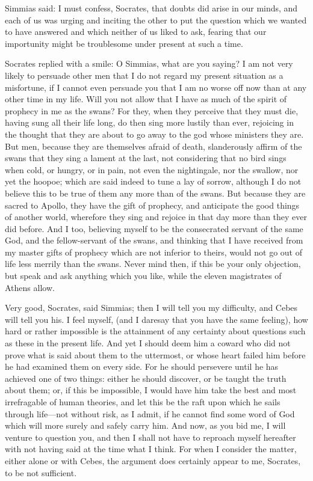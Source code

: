 \documentclass[11pt,letter]{article}
\begin{document}
\par  Simmias said: I must confess, Socrates, that doubts did arise in our minds, and each of us was urging and inciting the other to put the question which we wanted to have answered and which neither of us liked to ask, fearing that our importunity might be troublesome under present at such a time.

\par  Socrates replied with a smile: O Simmias, what are you saying? I am not very likely to persuade other men that I do not regard my present situation as a misfortune, if I cannot even persuade you that I am no worse off now than at any other time in my life. Will you not allow that I have as much of the spirit of prophecy in me as the swans? For they, when they perceive that they must die, having sung all their life long, do then sing more lustily than ever, rejoicing in the thought that they are about to go away to the god whose ministers they are. But men, because they are themselves afraid of death, slanderously affirm of the swans that they sing a lament at the last, not considering that no bird sings when cold, or hungry, or in pain, not even the nightingale, nor the swallow, nor yet the hoopoe; which are said indeed to tune a lay of sorrow, although I do not believe this to be true of them any more than of the swans. But because they are sacred to Apollo, they have the gift of prophecy, and anticipate the good things of another world, wherefore they sing and rejoice in that day more than they ever did before. And I too, believing myself to be the consecrated servant of the same God, and the fellow-servant of the swans, and thinking that I have received from my master gifts of prophecy which are not inferior to theirs, would not go out of life less merrily than the swans. Never mind then, if this be your only objection, but speak and ask anything which you like, while the eleven magistrates of Athens allow.

\par  Very good, Socrates, said Simmias; then I will tell you my difficulty, and Cebes will tell you his. I feel myself, (and I daresay that you have the same feeling), how hard or rather impossible is the attainment of any certainty about questions such as these in the present life. And yet I should deem him a coward who did not prove what is said about them to the uttermost, or whose heart failed him before he had examined them on every side. For he should persevere until he has achieved one of two things: either he should discover, or be taught the truth about them; or, if this be impossible, I would have him take the best and most irrefragable of human theories, and let this be the raft upon which he sails through life—not without risk, as I admit, if he cannot find some word of God which will more surely and safely carry him. And now, as you bid me, I will venture to question you, and then I shall not have to reproach myself hereafter with not having said at the time what I think. For when I consider the matter, either alone or with Cebes, the argument does certainly appear to me, Socrates, to be not sufficient.
\end{document}
